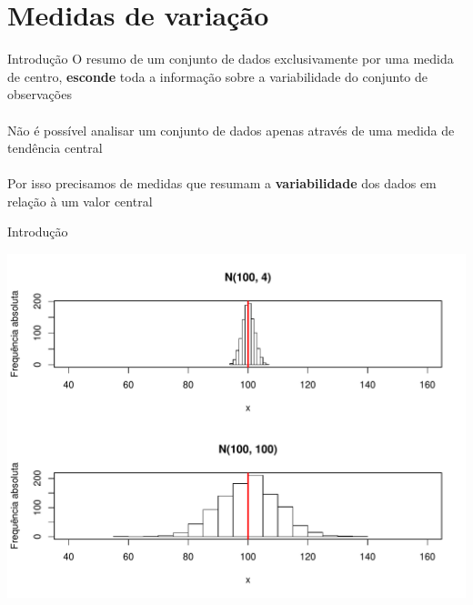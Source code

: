 \documentclass[10pt]{beamer}\usepackage[]{graphicx}\usepackage[]{color}
\newenvironment{knitrout}{}{} %
\theoremstyle{definition}
\begin{document}
\section{Medidas de variação}

\begin{frame}{Introdução}
 O resumo de um conjunto de dados exclusivamente por uma medida de
 centro, \textbf{esconde} toda a informação sobre a variabilidade do
 conjunto de observações \\~\\
 Não é possível analisar um conjunto de dados apenas através de uma
 medida de tendência central \\~\\
 Por isso precisamos de medidas que resumam a \textbf{variabilidade} dos
 dados em relação à um valor central
\end{frame}

\begin{frame}{Introdução}
\begin{knitrout}\footnotesize
{}\color{fgcolor}

{\centering \includegraphics[width=.95\textwidth]{figure/unnamed-chunk-1-1} 

}



\end{knitrout}
\end{frame}
\end{document}
